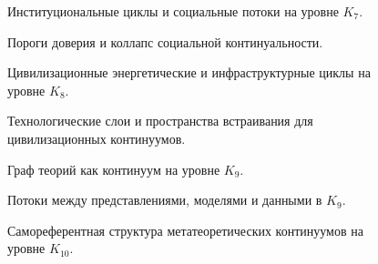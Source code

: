\begin{figure}[p]
  \centering
  
  \caption{Институциональные циклы и социальные потоки на уровне
           \texorpdfstring{\(K_7\)}{K_7}.}
  \label{fig:institutional-cycles}
\end{figure}

\begin{figure}[p]
  \centering
  
  \caption{Пороги доверия и коллапс социальной континуальности.}
  \label{fig:trust-threshold}
\end{figure}

\begin{figure}[p]
  \centering
  
  \caption{Цивилизационные энергетические и инфраструктурные циклы на уровне
           \texorpdfstring{\(K_8\)}{K_8}.}
  \label{fig:civilization-energy-cycles}
\end{figure}

\begin{figure}[p]
  \centering
  
  \caption{Технологические слои и пространства встраивания для
           цивилизационных континуумов.}
  \label{fig:technological-layers-m8}
\end{figure}

\begin{figure}[p]
  \centering
  
  \caption{Граф теорий как континуум на уровне
           \texorpdfstring{\(K_9\)}{K_9}.}
  \label{fig:theory-graph}
\end{figure}

\begin{figure}[p]
  \centering
  
  \caption{Потоки между представлениями, моделями и данными в
           \texorpdfstring{\(K_9\)}{K_9}.}
  \label{fig:representation-flow-graph}
\end{figure}

\begin{figure}[p]
  \centering
  
  \caption{Самореферентная структура метатеоретических континуумов на уровне
           \(K_{10}\).}
  \label{fig:metatheory-k10-selfreference}
\end{figure}
